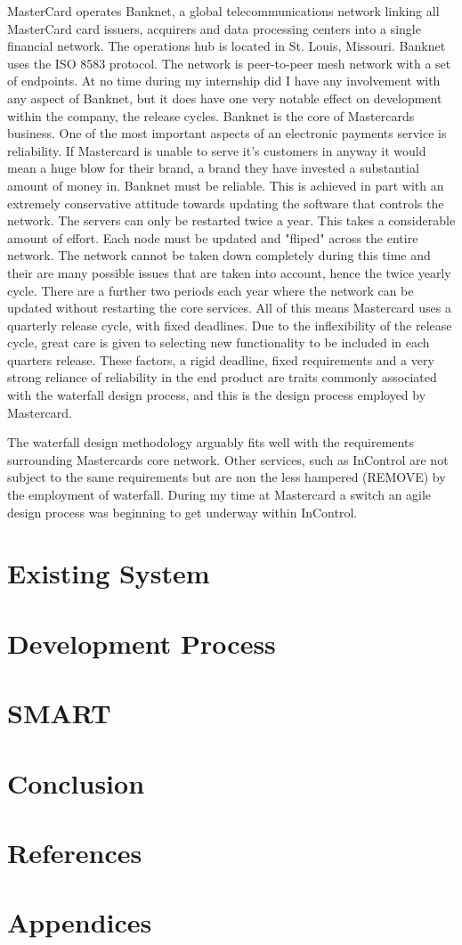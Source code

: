 \documentclass[a4paper,12pt, titlepage]{article}
\begin{document}
MasterCard operates Banknet, a global telecommunications network linking all MasterCard card issuers, acquirers and data processing centers into a single financial network. The operations hub is located in St. Louis, Missouri. Banknet uses the ISO 8583 protocol. The network is peer-to-peer mesh network with a set of endpoints. At no time during my internship did I have any involvement with any aspect of Banknet, but it does have one very notable effect on development within the company, the release cycles. Banknet is the core of Mastercards business. One of the most important aspects of an electronic payments service is reliability. If Mastercard is unable to serve it's customers in anyway it would mean a huge blow for their brand, a brand they have invested a substantial amount of money in. Banknet must be reliable. This is achieved in part with an extremely conservative attitude towards updating the software that controls the network. The servers can only be restarted twice a year. This takes a considerable amount of effort. Each node must be updated and "fliped" across the entire network. The network cannot be taken down completely during this time and their are many possible issues that are taken into account, hence the twice yearly cycle. There are a further two periods each year where the network can be updated without restarting the core services. All of this means Mastercard uses a quarterly release cycle, with fixed deadlines. Due to the inflexibility of the release cycle, great care is given to selecting new functionality to be included in each quarters release. These factors, a rigid deadline, fixed requirements and a very strong reliance of reliability in the end product are traits commonly associated with the waterfall design process, and this is the design process employed by Mastercard.

The waterfall design methodology arguably fits well with the requirements surrounding Mastercards core network. Other services, such as InControl are not subject to the same requirements but are non the less hampered (REMOVE) by the employment of waterfall. During my time at Mastercard a switch an agile design process was beginning to get underway within InControl.

\section{Existing System}


\section{Development Process}

\section{SMART}

\section{Conclusion}

\section{References}

\section{Appendices}
\end{document}
